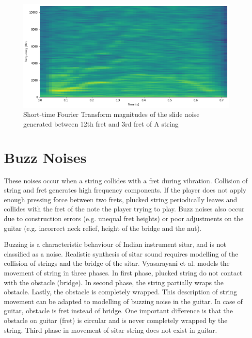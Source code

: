 \begin{figure}
    \centering
    \includegraphics[width=\columnwidth]{methods/S_NR_A_12to3_stft.png}
    \caption{Short-time Fourier Transform magnitudes of the slide noise generated between 12th fret and 3rd fret of A string}
    \label{fig:slide}
\end{figure}

\section{Buzz Noises}\label{buzzsection}

These noises occur when a string collides with a fret during vibration. Collision of string and fret generates high frequency components. If the player does not apply enough pressing force between two frets, plucked string periodically leaves and collides with the fret of the note the player trying to play. Buzz noises also occur due to construction errors (e.g. unequal fret heights) or poor adjustments on the guitar (e.g. incorrect neck relief, height of the bridge and the nut).

Buzzing is a characteristic behaviour of Indian instrument sitar, and is not classified as a noise. Realistic synthesis of sitar sound requires modelling of the collision of strings and the bridge of the sitar. Vyasarayani et al. \cite{vyasarayani2009} models the movement of string in three phases. In first phase, plucked string do not contact with the obstacle (bridge). In second phase, the string partially wraps the obstacle. Lastly, the obstacle is completely wrapped. This description of string movement can be adapted to modelling of buzzing noise in the guitar. In case of guitar, obstacle is fret instead of bridge. One important difference is that the obstacle on guitar (fret) is circular and is never completely wrapped by the string. Third phase in movement of sitar string does not exist in guitar.     
  
